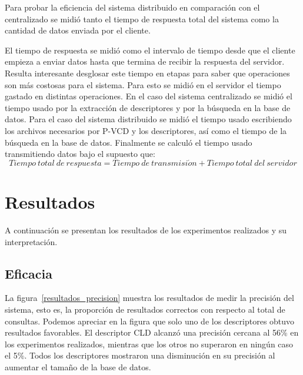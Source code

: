 Para probar la eficiencia del sistema distribuido en comparación con el centralizado se midió tanto el tiempo de respuesta total del sistema como la cantidad de datos enviada por el cliente. 

El tiempo de respuesta se midió como el intervalo de tiempo desde que el cliente empieza a enviar datos hasta que termina de recibir la respuesta del servidor. Resulta interesante desglosar este tiempo en etapas para saber que operaciones son más costosas para el sistema. Para esto se midió en el servidor el tiempo gastado en distintas operaciones. En el caso del sistema centralizado se midió el tiempo usado por la extracción de descriptores y por la búsqueda en la base de datos. Para el caso del sistema distribuido se midió el tiempo usado escribiendo los archivos necesarios por P-VCD y los descriptores, así como el tiempo de la búsqueda en la base de datos. Finalmente se calculó el tiempo usado transmitiendo datos bajo el supuesto que:
\begin{equation*}
\displaystyle{Tiempo\ total\ de\ respuesta}  =  \displaystyle{Tiempo\ de\ transmisi\acute{o}n} + \displaystyle{Tiempo\ total\ del\ servidor} 
\end{equation*}

\section{Resultados}\label{resultados}
A continuación se presentan los resultados de los experimentos realizados y su interpretación. 

\subsection{Eficacia}

La figura~\ref{resultados_precision} muestra los resultados de medir la precisión del sistema, esto es, la proporción de resultados correctos con respecto al total de consultas. Podemos apreciar en la figura que  solo uno de los descriptores obtuvo resultados favorables. El descriptor CLD alcanzó una precisión cercana al 56\% en los experimentos realizados, mientras que los otros no superaron en ningún caso el 5\%. Todos los descriptores mostraron una disminución en su precisión al aumentar el tamaño de la base de datos.

